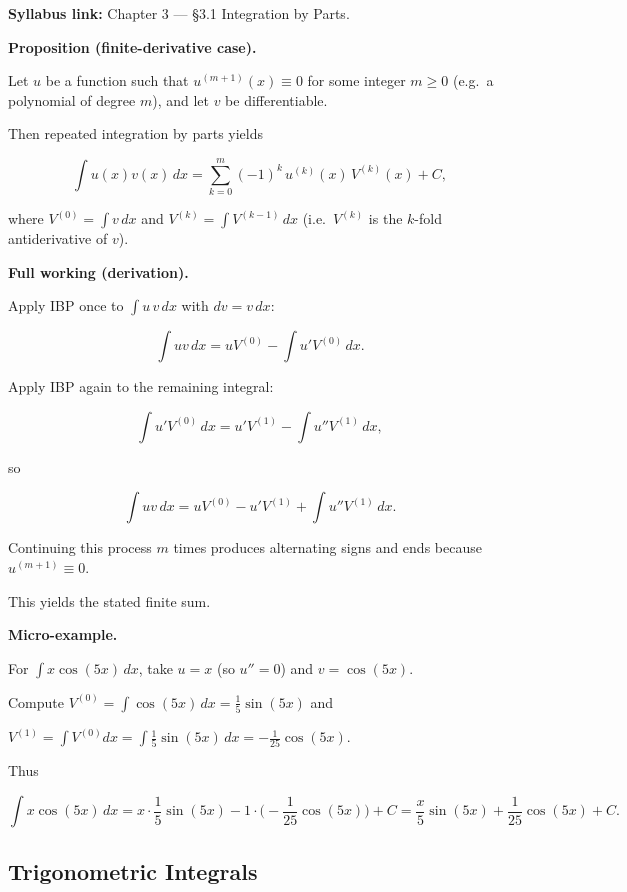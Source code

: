 \begin{extension}[title={Extension (Beyond Syllabus: Tabular Integration by Parts)}]

\textbf{Syllabus link:} Chapter 3 — \S3.1 Integration by Parts.

\textbf{Proposition (finite-derivative case).}

Let $u$ be a function such that $u^{(m+1)}(x)\equiv 0$ for some integer $m\ge 0$ (e.g.\ a polynomial of degree $m$), and let $v$ be differentiable.

Then repeated integration by parts yields

\[
\int u(x)v(x)\,dx
= \sum_{k=0}^{m}(-1)^k\,u^{(k)}(x)\,V^{(k)}(x)+C,
\]

where $V^{(0)}=\int v\,dx$ and $V^{(k)}=\int V^{(k-1)}\,dx$ (i.e.\ $V^{(k)}$ is the $k$-fold antiderivative of $v$).

\textbf{Full working (derivation).}

Apply IBP once to $\int u\,v\,dx$ with $dv=v\,dx$:

\[
\int u v\,dx = uV^{(0)}-\int u'V^{(0)}\,dx.
\]

Apply IBP again to the remaining integral:

\[
\int u'V^{(0)}\,dx = u'V^{(1)}-\int u''V^{(1)}\,dx,
\]

so

\[
\int u v\,dx = uV^{(0)}-u'V^{(1)}+\int u''V^{(1)}\,dx.
\]

Continuing this process $m$ times produces alternating signs and ends because $u^{(m+1)}\equiv 0$.

This yields the stated finite sum.

\textbf{Micro-example.}

For $\int x\cos(5x)\,dx$, take $u=x$ (so $u''=0$) and $v=\cos(5x)$.

Compute $V^{(0)}=\int \cos(5x)\,dx=\frac{1}{5}\sin(5x)$ and

$V^{(1)}=\int V^{(0)}dx=\int \frac{1}{5}\sin(5x)\,dx=-\frac{1}{25}\cos(5x)$.

Thus

\[
\int x\cos(5x)\,dx = x\cdot \frac{1}{5}\sin(5x)-1\cdot\Big(-\frac{1}{25}\cos(5x)\Big)+C
= \frac{x}{5}\sin(5x)+\frac{1}{25}\cos(5x)+C.
\]

\end{extension}

\subsection{Trigonometric Integrals}

